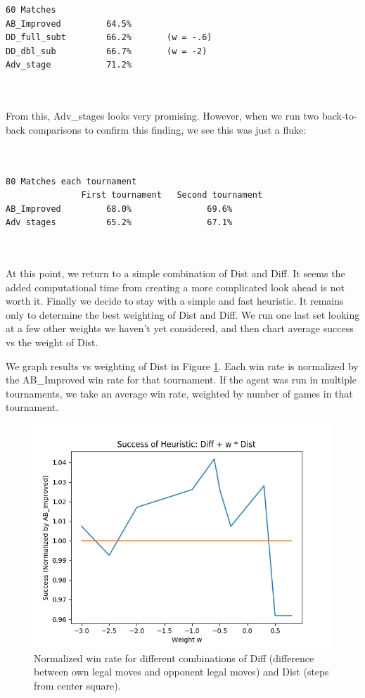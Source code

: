 \documentclass[a4paper,12pt]{article}
\begin{document}
\begin{verbatim}
60 Matches
AB_Improved         64.5%
DD_full_subt        66.2%       (w = -.6)
DD_dbl_sub          66.7%       (w = -2)
Adv_stage           71.2%



\end{verbatim}
From this, Adv\_stages looks very promising. However, when we run two back-to-back comparisons to confirm this finding, we see this was just a fluke:

\begin{verbatim}
                   

80 Matches each tournament
               First tournament   Second tournament
AB_Improved         68.0%               69.6%
Adv stages          65.2%               67.1%



\end{verbatim}

At this point, we return to a simple combination of Dist and Diff.  It seems the added computational time from creating a more complicated look ahead is not
worth it.   Finally we decide to stay with a simple and fast heuristic. It remains only to determine the best weighting of Dist and Diff. We run one last
set looking at a few other weights we haven't yet considered, and then chart average success vs the weight of Dist.

We graph results vs weighting of Dist in Figure \ref{fig:dd-combinations}.  Each win rate is normalized by the AB\_Improved win rate for that tournament. If the agent was run in multiple 
tournaments, we take an average win rate, weighted by number of games in that tournament.


\begin{figure}
  \includegraphics[width=\linewidth]{Dist_weights.jpg}
  \caption{Normalized win rate for different combinations of Diff (difference between own legal moves and opponent legal moves) and Dist (steps from center square).}
  \label{fig:dd-combinations}
\end{figure}
\end{document}
